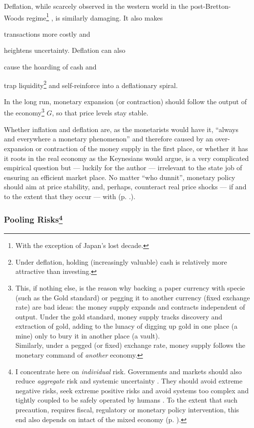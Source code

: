 Deflation, while scarcely observed in the western world in the post-Bretton-Woods regime\footnote{
	With the exception of Japan's lost decade.}%
, is similarly damaging. It also makes \begin{inparaenum}[\itshape 1\upshape)]
	\item transactions more costly and 
	\item heightens uncertainty. Deflation can also 
	\item cause the hoarding of cash and 
	\item trap liquidity\footnote{
		Under deflation, holding (increasingly valuable) cash is relatively more attractive than investing.} 
	and self-reinforce into a deflationary spiral.
	\end{inparaenum}

In the long run, monetary expansion (or contraction) should follow the output of the economy\footnote{
	This, if nothing else, is the reason why backing a paper currency with specie (such as the Gold standard) or pegging it to another currency (fixed exchange rate) are bad ideas: the money supply expands and contracts independent of output. Under the gold standard, money supply tracks discovery and extraction of gold, adding to the lunacy of digging up gold in one place (a mine) only to bury it in another place (a vault). \\ 
	Similarly, under a pegged (or fixed) exchange rate, money supply follows the monetary command of \emph{another} economy.} 
$G$, so that price levels stay stable.

Whether inflation and deflation are, as the monetarists would have it, ``always and everywhere a monetary phenomenon'' \citep{Friedman1970} %
and therefore caused by an over-expansion or contraction of the money supply in the first place, or whether it has it roots in the real economy as the Keynesians would argue, is a very complicated empirical question but --- luckily for the author --- irrelevant to the state job of ensuring an efficient market place. No matter ``who dunnit'', monetary policy should aim at price stability, and, perhaps, counteract real price shocks --- if and to the extent that they occur --- with  (p. \pageref{sec:monetary_stimulus}.).%

\subsubsection[Pooling Risks]{Pooling Risks\footnote{
	I concentrate here on \emph{individual} risk. Governments and markets should also reduce \emph{aggregate} risk and systemic uncertainty \citep{Knight1921}. They should avoid extreme negative risks, seek extreme positive risks \citep{Taleb2007} and avoid systems too complex and tightly coupled to be safely operated by humans \citep{Perrow-1999-aa}. To the extent that such precaution, requires fiscal, regulatory or monetary policy intervention, this end also depends on intact  of the mixed economy (p. \pageref{sec:means}).}}
	\label{sec:risk}

